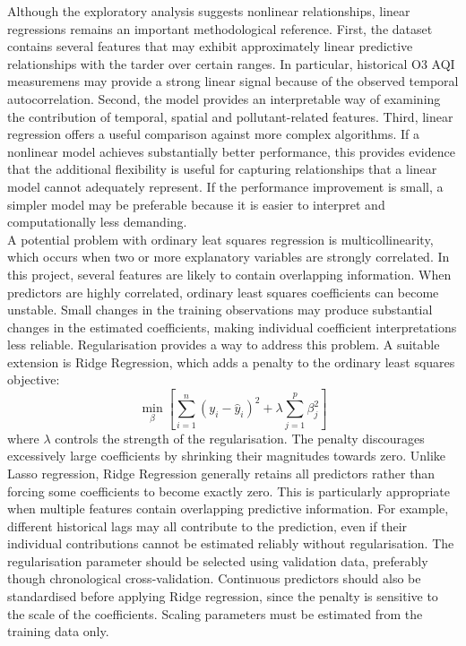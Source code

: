 \documentclass[11pt,a4paper]{article}
\begin{document}
\noindent
Although the exploratory analysis suggests nonlinear relationships, linear regressions remains an important methodological reference. First, the dataset contains several features that may exhibit approximately linear predictive relationships with the tarder over certain ranges. In particular, historical O3 AQI measuremens may provide a strong linear signal because of the observed temporal autocorrelation. Second, the model provides an interpretable way of examining the contribution of temporal, spatial and pollutant-related features. Third, linear regression offers a useful comparison against more complex algorithms. If a nonlinear model achieves substantially better performance, this provides evidence that the additional flexibility is useful for capturing relationships that a linear model cannot adequately represent. If the performance improvement is small, a simpler model may be preferable because it is easier to interpret and computationally less demanding.\\

\noindent
A potential problem with ordinary leat squares regression is multicollinearity, which occurs when two or more explanatory variables are strongly correlated. In this project, several features are likely to contain overlapping information. When predictors are highly correlated, ordinary least squares coefficients can become unstable. Small changes in the training observations may produce substantial changes in the estimated coefficients, making individual coefficient interpretations less reliable. Regularisation provides a way to address this problem. A suitable extension is Ridge Regression, which adds a penalty to the ordinary least squares objective:
\begin{equation}
    \min_\beta\left[\sum_{i=1}^n(y_i-\hat{y}_i)^2+\lambda\sum_{j=1}^p\beta_j^2\right]
\end{equation}
\noindent
where $\lambda$ controls the strength of the regularisation. The penalty discourages excessively large coefficients by shrinking their magnitudes towards zero. Unlike Lasso regression, Ridge Regression generally retains all predictors rather than forcing some coefficients to become exactly zero. This is particularly appropriate when multiple features contain overlapping predictive information. For example, different historical lags may all contribute to the prediction, even if their individual contributions cannot be estimated reliably without regularisation. The regularisation parameter should be selected using validation data, preferably though chronological cross-validation. Continuous predictors should also be standardised before applying Ridge regression, since the penalty is sensitive to the scale of the coefficients. Scaling parameters must be estimated from the training data only.\\
\end{document}
